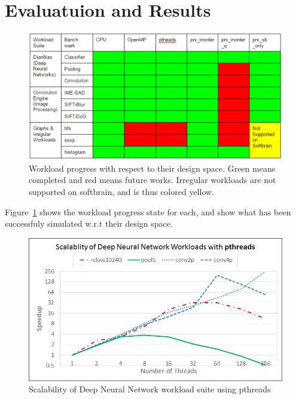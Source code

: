 \section{Evaluatuion and Results} \label{sec:eval}

\begin{figure}
  \begin{center}
    \includegraphics[width=\linewidth]{cs758-figs/workload-progress.png}
  \end{center}
\vspace{-0.2in}
  \caption{Workload progress with respect to their design space. Green means completed and red means future works. Irregular workloads are not supported on softbrain, and is thus colored yellow.}
  \label{fig:workload-progress}
\vspace{-0.05in}
\end{figure}

Figure~\ref{fig:workload-progress} shows the workload progress state for each, and 
show what has been successfuly simulated w.r.t their design space. 


\begin{figure}
  \begin{center}
    \includegraphics[width=\linewidth]{cs758-figs/scalability-dnn-pthread.png}
  \end{center}
\vspace{-0.2in}
  \caption{Scalability of Deep Neural Network workload suite using pthreads}
  \label{fig:scalability-dnn-pthread}
\vspace{-0.05in}
\end{figure}

